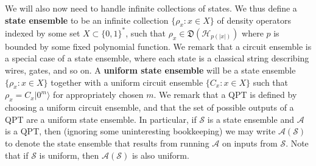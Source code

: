 \documentclass[11pt]{article}
\numberwithin{equation}{section}
\newcommand{\opn}{\operatorname}
\newcommand{\algo}{\mathcal}
\newcommand{\negl}{\opn{negl}}
\newcommand{\states}{\mathfrak D}
\newcommand{\ga}[1]{{ \textcolor{purple}{(Gorjan:  #1)}}{}}
\newcommand{\wf}[1]{{ \textcolor{orange}{(Bill:  #1)}}{}}
\begin{document}
{%
%

We will also now need to handle infinite collections of states. We thus define a \textbf{state ensemble} to be an infinite collection $\{\rho_x : x \in X\}$ of density operators indexed by some set $X \subset \{0, 1\}^*$, such that $\rho_x \in \states(\mathcal H_{p(|x|)})$ where $p$ is bounded by some fixed polynomial function. We remark that a circuit ensemble is a special case of a state ensemble, where each state is a classical string describing wires, gates, and so on. A \textbf{uniform state ensemble} will be a state ensemble $\{\rho_x : x \in X\}$ together with a uniform circuit ensemble $\{C_x : x \in X\}$ such that $\rho_x = C_x |0^m\rangle$ for appropriately chosen $m$. We remark that a QPT is defined by choosing a uniform circuit ensemble, and that the set of possible outputs of a QPT are a uniform state ensemble. In particular, if $\mathcal S$ is a state ensemble and $\algo A$ is a QPT, then (ignoring some uninteresting bookkeeping) we may write $\algo A(\mathcal S)$ to denote the state ensemble that results from running $\algo A$ on inputs from $\mathcal S$. Note that if $\mathcal S$ is uniform, then $\algo A(\mathcal S)$ is also uniform.

}
\end{document}
